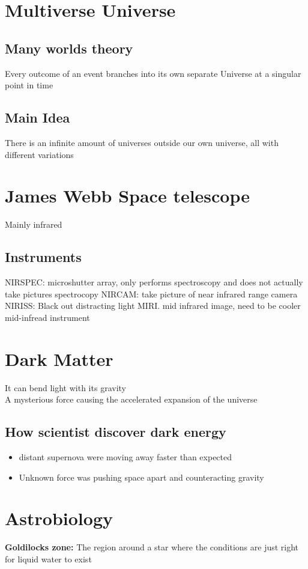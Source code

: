 \section{Multiverse Universe}
\subsection{Many worlds theory}
Every outcome of an event branches into its own separate Universe at a singular point in time

\subsection{Main Idea}
There is an infinite amount of universes outside our own universe, all with different variations

\section{James Webb Space telescope}
Mainly infrared

\subsection{Instruments}
NIRSPEC: microshutter array, only performs spectroscopy and does not actually take pictures spectrocopy 
NIRCAM: take picture of near infrared range camera
NIRISS: Black out distracting light
MIRI. mid infrared image, need to be cooler mid-infread instrument

\section{Dark Matter}
It can bend light with its gravity\\
A mysterious force causing the accelerated expansion of the universe

\subsection{How scientist discover dark energy}
\begin{itemize}
    \item distant supernova were moving away faster than expected
    \item Unknown force was pushing space apart and counteracting gravity
\end{itemize}

\section{Astrobiology}
\begin{redblock}
    \textbf{Goldilocks zone:} The region around a star where the conditions are just right for liquid water to exist
\end{redblock}

